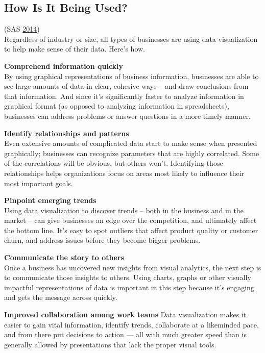 \documentclass[]{book}
\begin{document}
\hypertarget{how-is-it-being-used}{%
\subsection{How Is It Being Used?}\label{how-is-it-being-used}}

(SAS \protect\hyperlink{ref-why_dataviz_matters}{2014})\\
Regardless of industry or size, all types of businesses are using data visualization to help make sense of their data. Here's how.

\textbf{Comprehend information quickly}\\
By using graphical representations of business information, businesses are able to see large amounts of data in clear, cohesive ways -- and draw conclusions from that information. And since it's significantly faster to analyze information in graphical format (as opposed to analyzing information in spreadsheets), businesses can address problems or answer questions in a more timely manner.

\textbf{Identify relationships and patterns}\\
Even extensive amounts of complicated data start to make sense when presented graphically; businesses can recognize parameters that are highly correlated. Some of the correlations will be obvious, but others won't. Identifying those relationships helps organizations focus on areas most likely to influence their most important goals.

\textbf{Pinpoint emerging trends}\\
Using data visualization to discover trends -- both in the business and in the market -- can give businesses an edge over the competition, and ultimately affect the bottom line. It's easy to spot outliers that affect product quality or customer churn, and address issues before they become bigger problems.

\textbf{Communicate the story to others}\\
Once a business has uncovered new insights from visual analytics, the next step is to communicate those insights to others. Using charts, graphs or other visually impactful representations of data is important in this step because it's engaging and gets the message across quickly.

\textbf{Improved collaboration among work teams}
Data visualization makes it easier to gain vital information, identify trends, collaborate at a likeminded pace, and from there put decisions to action --- all with much greater speed than is generally allowed by presentations that lack the proper visual tools.
\end{document}
